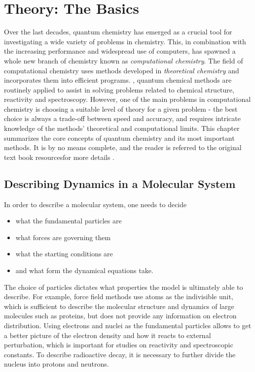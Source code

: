 \chapter{Theory: The Basics}

Over the last decades, quantum chemistry has emerged as a crucial tool for investigating a wide variety of problems in chemistry. This, in combination with the increasing performance and widespread use of computers, has spawned a whole new branch of chemistry known as \emph{computational chemistry}. The field of computational chemistry uses methods developed in \emph{theoretical chemistry} and incorporates them into efficient programs. , quantum chemical methods are routinely applied to assist in solving problems related to chemical structure, reactivity and spectroscopy. However, one of the main problems in computational chemistry is choosing a suitable level of theory for a given problem - the best choice is always a trade-off between speed and accuracy, and requires intricate knowledge of the methods' theoretical and computational limits. This chapter summarizes the core concepts of quantum chemistry and its most important methods. It is by no means complete, and the reader is referred to the original text book resourcesfor more details \cite{Sza1996,Hel2000,Jen2017,Nor2018,Sch2018}.

\section{Describing Dynamics in a Molecular System}

In order to describe a molecular system, one needs to decide
\begin{itemize}
\item what the fundamental particles are
\item what forces are governing them
\item what the starting conditions are
\item and what form the dynamical equations take.
\end{itemize}
\noindent The choice of particles dictates what properties the model is ultimately able to describe. For example, force field methods use atoms as the indivisible unit, which is sufficient to describe the molecular structure and dynamics of large molecules such as proteins, but does not provide any information on electron distribution. Using electrons and nuclei as the fundamental particles allows to get a better picture of the electron density and how it reacts to external perturbation, which is important for studies on reactivity and spectroscopic constants. To describe radioactive decay, it is necessary to further divide the nucleus into protons and neutrons. 

